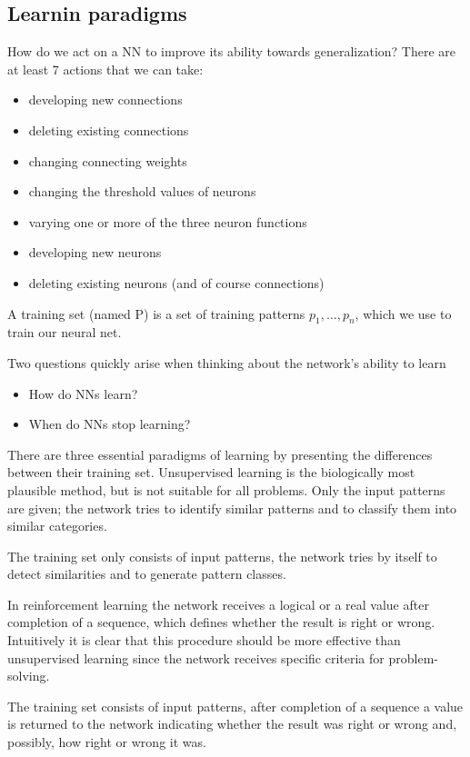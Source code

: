 \subsection*{Learnin paradigms}
How do we act on a NN to improve its ability towards generalization? There are at least 7 actions that we can take:
\begin{itemize}
    \item developing new connections
    \item deleting existing connections
    \item changing connecting weights
    \item changing the threshold values of neurons
    \item varying one or more of the three neuron functions
    \item developing new neurons
    \item deleting existing neurons (and of course connections)
\end{itemize}
\begin{definition}
    A training set (named P) is a set of training patterns $p_{1}, \ldots,p_{n}$, which we use to train our neural net. 
\end{definition}
Two questions quickly arise when thinking about the network's ability to learn 
\begin{itemize}
    \item How do NNs learn?
    \item When do NNs stop learning?
\end{itemize}
There are three essential paradigms of learning by presenting the differences between their training set.
Unsupervised learning is the biologically most plausible method, but is not suitable for all problems. Only the input patterns are given; the network tries to identify similar patterns and to classify them into similar categories.
\begin{definition}
    The training set only consists of input patterns, the network tries by itself to detect similarities and to generate pattern classes.
\end{definition}
In reinforcement learning the network receives a logical or a real value after completion of a sequence, which defines whether the result is right or wrong. Intuitively it is clear that this procedure should be more effective than unsupervised learning since the network receives specific criteria for problem-solving.
\begin{definition}
    The training set consists of input patterns, after completion of a sequence a value is returned to the network indicating whether the result was right or wrong and, possibly, how right or wrong it was.
\end{definition}
